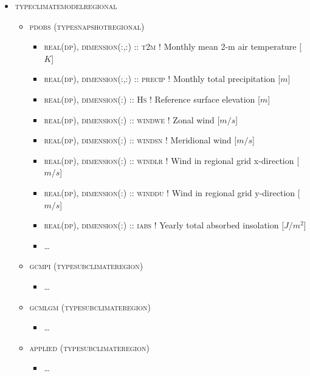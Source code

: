 \documentclass{article}
\begin{document}
\begin{itemize}
\item \textsc{type\textunderscore climate\textunderscore model\textunderscore regional}
\begin{itemize}

  \item \textsc{pd\textunderscore obs (type\textunderscore snapshot\textunderscore regional)}
  \begin{itemize}
    \item \textsc{real(dp), dimension(:,:) :: t2m} ! Monthly mean 2-m air temperature [$K$]
    \item \textsc{real(dp), dimension(:,:) :: precip} ! Monthly total precipitation [$m$]
    \item \textsc{real(dp), dimension(:) :: Hs} ! Reference surface elevation [$m$]
    \item \textsc{real(dp), dimension(:) :: wind\textunderscore we} ! Zonal wind [$m/s$]
    \item \textsc{real(dp), dimension(:) :: wind\textunderscore sn} ! Meridional wind [$m/s$]
    \item \textsc{real(dp), dimension(:) :: wind\textunderscore lr} ! Wind in regional grid x-direction [$m/s$]
    \item \textsc{real(dp), dimension(:) :: wind\textunderscore du} ! Wind in regional grid y-direction [$m/s$]
    \item \textsc{real(dp), dimension(:) :: i\textunderscore abs} ! Yearly total absorbed insolation [$J/m^2$]
    \item \dots
  \end{itemize}
  
  \item \textsc{gcm\textunderscore pi (type\textunderscore subclimate\textunderscore region)}
  \begin{itemize}
    \item \dots
  \end{itemize}
  
  \item \textsc{gcm\textunderscore lgm (type\textunderscore subclimate\textunderscore region)}
  \begin{itemize}
    \item \dots
  \end{itemize}
  
  \item \textsc{applied (type\textunderscore subclimate\textunderscore region)}
  \begin{itemize}
    \item \dots
  \end{itemize}
  
\end{itemize}
\end{itemize}
\end{document}
